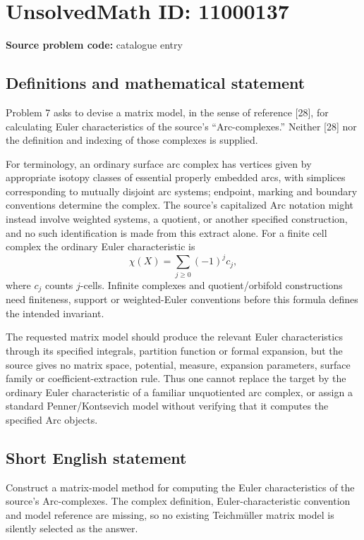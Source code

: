 \documentclass[11pt]{article}
\begin{document}
\section*{UnsolvedMath ID: 11000137}
\textbf{Source problem code:} catalogue entry
\subsection{Definitions and mathematical statement}
Problem 7 asks to devise a matrix model, in the sense of reference [28], for calculating Euler characteristics of the source's ``Arc-complexes.'' Neither [28] nor the definition and indexing of those complexes is supplied.

For terminology, an ordinary surface arc complex has vertices given by appropriate isotopy classes of essential properly embedded arcs, with simplices corresponding to mutually disjoint arc systems; endpoint, marking and boundary conventions determine the complex. The source's capitalized Arc notation might instead involve weighted systems, a quotient, or another specified construction, and no such identification is made from this extract alone. For a finite cell complex the ordinary Euler characteristic is
\[
 \chi(X)=\sum_{j\ge0}(-1)^j c_j,
\]
where \(c_j\) counts \(j\)-cells. Infinite complexes and quotient/orbifold constructions need finiteness, support or weighted-Euler conventions before this formula defines the intended invariant.

The requested matrix model should produce the relevant Euler characteristics through its specified integrals, partition function or formal expansion, but the source gives no matrix space, potential, measure, expansion parameters, surface family or coefficient-extraction rule. Thus one cannot replace the target by the ordinary Euler characteristic of a familiar unquotiented arc complex, or assign a standard Penner/Kontsevich model without verifying that it computes the specified Arc objects.
\subsection{Short English statement}
Construct a matrix-model method for computing the Euler characteristics of the source's Arc-complexes. The complex definition, Euler-characteristic convention and model reference are missing, so no existing Teichmüller matrix model is silently selected as the answer.
\end{document}
